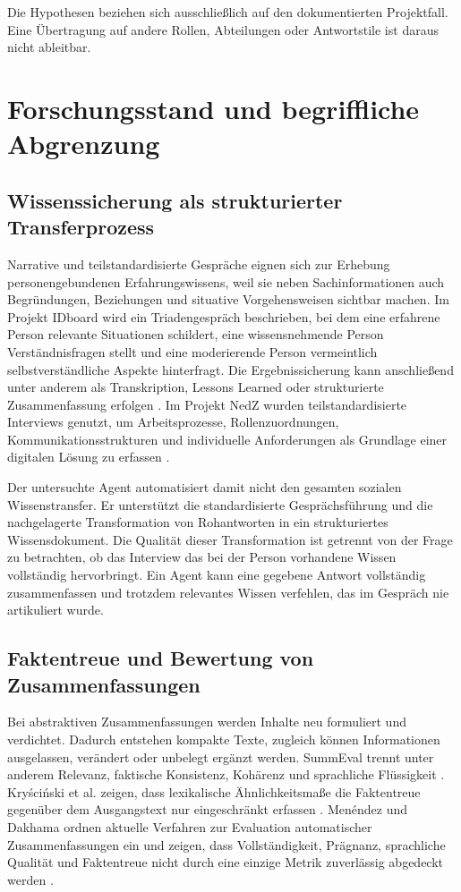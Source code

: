 \documentclass[
  10pt,
  ngerman,
  a4paper,
  toc=graduated,
  numbers=noenddot,
  headings=standardclasses,
  nonumberlist
]{scrartcl}
\begin{document}
Die Hypothesen beziehen sich ausschließlich auf den dokumentierten Projektfall. Eine Übertragung auf andere Rollen, Abteilungen oder Antwortstile ist daraus nicht ableitbar.

\section{Forschungsstand und begriffliche Abgrenzung}

\subsection{Wissenssicherung als strukturierter Transferprozess}

Narrative und teilstandardisierte Gespräche eignen sich zur Erhebung personengebundenen Erfahrungswissens, weil sie neben Sachinformationen auch Begründungen, Beziehungen und situative Vorgehensweisen sichtbar machen. Im Projekt IDboard wird ein Triadengespräch beschrieben, bei dem eine erfahrene Person relevante Situationen schildert, eine wissensnehmende Person Verständnisfragen stellt und eine moderierende Person vermeintlich selbstverständliche Aspekte hinterfragt. Die Ergebnissicherung kann anschließend unter anderem als Transkription, Lessons Learned oder strukturierte Zusammenfassung erfolgen \cite[S.~132--136]{sander_onboarding_2023}. Im Projekt NedZ wurden teilstandardisierte Interviews genutzt, um Arbeitsprozesse, Rollenzuordnungen, Kommunikationsstrukturen und individuelle Anforderungen als Grundlage einer digitalen Lösung zu erfassen \cite[S.~10--11]{boehme_nedz_2023}.

Der untersuchte Agent automatisiert damit nicht den gesamten sozialen Wissenstransfer. Er unterstützt die standardisierte Gesprächsführung und die nachgelagerte Transformation von Rohantworten in ein strukturiertes Wissensdokument. Die Qualität dieser Transformation ist getrennt von der Frage zu betrachten, ob das Interview das bei der Person vorhandene Wissen vollständig hervorbringt. Ein Agent kann eine gegebene Antwort vollständig zusammenfassen und trotzdem relevantes Wissen verfehlen, das im Gespräch nie artikuliert wurde.

\subsection{Faktentreue und Bewertung von Zusammenfassungen}

Bei abstraktiven Zusammenfassungen werden Inhalte neu formuliert und verdichtet. Dadurch entstehen kompakte Texte, zugleich können Informationen ausgelassen, verändert oder unbelegt ergänzt werden. SummEval trennt unter anderem Relevanz, faktische Konsistenz, Kohärenz und sprachliche Flüssigkeit \cite{fabbri2021}. Kryściński et al. zeigen, dass lexikalische Ähnlichkeitsmaße die Faktentreue gegenüber dem Ausgangstext nur eingeschränkt erfassen \cite{kryscinski2020}. Menéndez und Dakhama ordnen aktuelle Verfahren zur Evaluation automatischer Zusammenfassungen ein und zeigen, dass Vollständigkeit, Prägnanz, sprachliche Qualität und Faktentreue nicht durch eine einzige Metrik zuverlässig abgedeckt werden \cite{menendez2024}.
\end{document}
